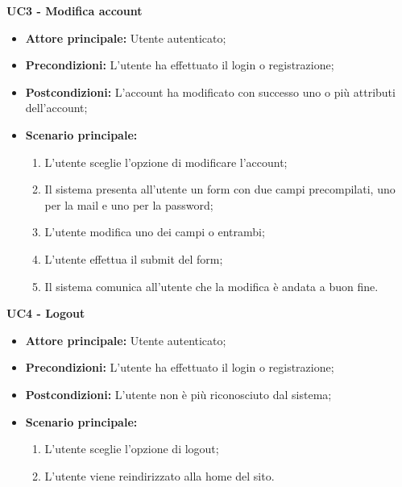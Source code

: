 
\textbf{UC3 - Modifica account}
\begin{itemize}
    \item \textbf{Attore principale: }Utente autenticato;
    \item \textbf{Precondizioni: }L'utente ha effettuato il login o registrazione;
    \item \textbf{Postcondizioni: }L'account ha modificato con successo uno o più attributi dell'account;
    \item \textbf{Scenario principale:} 
        \begin{enumerate}
            \item L'utente sceglie l'opzione di modificare l'account;
            \item Il sistema presenta all'utente un form con due campi precompilati, uno per la mail e uno per la password;
            \item L'utente modifica uno dei campi o entrambi;
            \item L'utente effettua il submit del form;
            \item Il sistema comunica all'utente che la modifica è andata a buon fine.
        \end{enumerate}
\end{itemize}

\textbf{UC4 - Logout}
\begin{itemize}
    \item \textbf{Attore principale: }Utente autenticato;
    \item \textbf{Precondizioni: }L'utente ha effettuato il login o registrazione;
    \item \textbf{Postcondizioni: }L'utente non è più riconosciuto dal sistema;
    \item \textbf{Scenario principale:} 
        \begin{enumerate}
            \item L'utente sceglie l'opzione di logout;
            \item L'utente viene reindirizzato alla home del sito.
        \end{enumerate}
\end{itemize}

